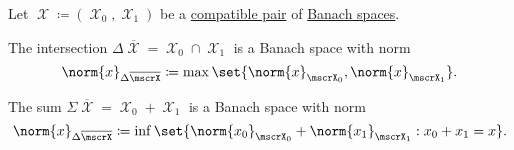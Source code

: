 \begin{proposition}\label{def:banach_space_sum_and_intersection_norms}
  Let \( \mscrX \coloneqq (\mscrX_0, \mscrX_1) \) be a \hyperref[def:interpolated_topological_vector_space/compatibility]{compatible pair} of \hyperref[def:banach_space]{Banach spaces}.

  \begin{thmenum}
     The intersection \( \Delta \overline{\mscrX} = \mscrX_0 \cap \mscrX_1 \) is a Banach space with norm
    \begin{equation}\label{eq:def:banach_space_sum_and_intersection_norms/intersection}
      \norm{x}_{\Delta \overline{\mscrX}} \coloneqq \max \set{ \norm{x}_{\mscrX_0}, \norm{x}_{\mscrX_1} }.
    \end{equation}

     The sum \( \Sigma \overline{\mscrX} = \mscrX_0 + \mscrX_1 \) is a Banach space with norm
    \begin{equation}\label{eq:def:banach_space_sum_and_intersection_norms/sum}
      \norm{x}_{\Delta \overline{\mscrX}} \coloneqq \inf \set{ \norm{x_0}_{\mscrX_0} + \norm{x_1}_{\mscrX_1} : x_0 + x_1 = x }.
    \end{equation}
  \end{thmenum}
\end{proposition}
